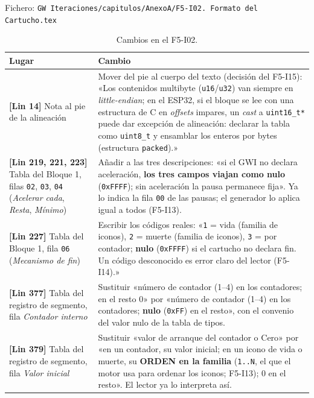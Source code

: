 Fichero: \texttt{GW Iteraciones/capitulos/AnexoA/F5-I02. Formato del Cartucho.tex}

\begin{table}[H]
	\centering
	\begin{tabularx}{\textwidth}{>{\RaggedRight\arraybackslash}p{4.2cm} >{\RaggedRight\arraybackslash}X}
		\toprule
		\textbf{Lugar} & \textbf{Cambio} \\
		\midrule
		\textbf{[Lin 14]} Nota al pie de la alineación &
		Mover del pie al cuerpo del texto (decisión del F5-I15): «Los
		contenidos multibyte (\texttt{u16}/\texttt{u32}) van siempre en
		\textit{little-endian}; en el ESP32, si el bloque se lee con una
		estructura de C en \textit{offsets} impares, un \textit{cast} a
		\texttt{uint16\_t*} puede dar excepción de alineación: declarar
		la tabla como \texttt{uint8\_t} y ensamblar los enteros por
		bytes (estructura \texttt{packed}).» \\
		\midrule
		\textbf{[Lin 219, 221, 223]} Tabla del Bloque 1, filas \texttt{02}, \texttt{03},
		\texttt{04} (\emph{Acelerar cada}, \emph{Resta}, \emph{Mínimo}) &
		Añadir a las tres descripciones: «si el GWI no declara
		aceleración, \textbf{los tres campos viajan como nulo} (\texttt{0xFFFF});
		sin aceleración la pausa permanece fija». Ya lo indica la fila
		\texttt{00} de las pausas; el generador lo aplica igual a todos
		(F5-I13). \\
		\midrule
		\textbf{[Lin 227]} Tabla del Bloque 1, fila \texttt{06} (\emph{Mecanismo de fin}) &
		Escribir los códigos reales: «\texttt{1} = vida (familia de
		iconos), \texttt{2} = muerte (familia de iconos),
		\texttt{3} = por contador; \textbf{nulo} (\texttt{0xFFFF}) si el cartucho
		no declara fin. Un código desconocido es error claro del lector
		(F5-I14).» \\
		\midrule
		\textbf{[Lin 377]} Tabla del registro de segmento, fila \emph{Contador interno} &
		Sustituir «número de contador (1--4) en los contadores; en el
		resto 0» por «número de contador (1--4) en los contadores;
		\textbf{nulo} (\texttt{0xFF}) en el resto», con el convenio del valor
		nulo de la tabla de tipos. \\
		\midrule
		\textbf{[Lin 379]} Tabla del registro de segmento, fila \emph{Valor inicial} &
		Sustituir «valor de arranque del contador o Cero» por «en un
		contador, su valor inicial; en un icono de vida o muerte, su
		\textbf{ORDEN en la familia} (\texttt{1..N}, el que el motor usa para
		ordenar los iconos; F5-I13); 0 en el resto». El lector ya lo
		interpreta así. \\
		\bottomrule
	\end{tabularx}
	\caption{Cambios en el F5-I02.}
\end{table}

